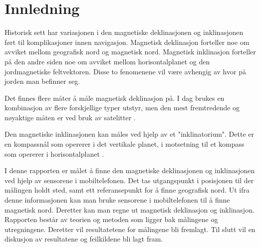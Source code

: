 \section{Innledning}

Historisk sett har variasjonen i den magnetiske deklinasjonen og inklinasjonen ført til komplikasjoner innen navigasjon. Magnetisk deklinasjon forteller noe om avviket mellom geografisk nord og magnetisk nord. Magnetisk inklinasjon forteller på den andre siden noe om avviket mellom horisontalplanet og den jordmagnetiske feltvektoren. Disse to fenomenene vil være avhengig av hvor på jorden man befinner seg.  

Det finnes flere måter å måle magnetisk deklinasjon på. I dag brukes en kombinasjon av flere forskjellige typer utstyr, men den mest fremtredende og nøyaktige måten er ved bruk av satelitter \cite{World_magnetic_model}.     

Den magnetiske inklinasjonen kan måles ved hjelp av et "inklinatorium". Dette er en kompassnål som opererer i det vertikale planet, i motsetning til et kompass som opererer i horisontalplanet \cite{inklinometer}. 

I denne rapporten er målet å finne den magnetiske deklinasjonen og inklinasjonen ved hjelp av sensorene i mobiltelefonen. Det tas utgangspunkt i posisjonen til der målingen holdt sted, samt ett referansepunkt for å finne geografisk nord. Ut ifra denne informasjonen kan man bruke sensorene i mobiltelefonen til å finne magnetisk nord. Deretter kan man regne ut magnetisk deklinasjon og inklinasjon. Rapporten består av teorien og metoden som ligger bak målingene og utregningene. Deretter vil resultatetene for målingene bli fremlagt. Til slutt vil en diskusjon av resultatene og feilkildene bli lagt fram. 